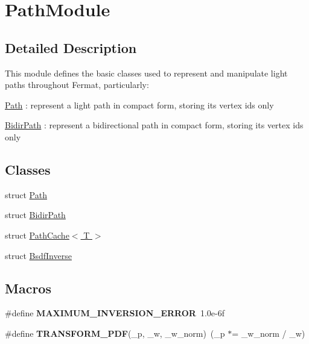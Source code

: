 \hypertarget{group___path_module}{}\section{Path\+Module}
\label{group___path_module}


\subsection{Detailed Description}
\begin{DoxyParagraph}{}
This module defines the basic classes used to represent and manipulate light paths throughout Fermat, particularly\+: 
\end{DoxyParagraph}
\begin{DoxyParagraph}{}

\begin{DoxyItemize}
\item \hyperlink{struct_path}{Path} \+: represent a light path in compact form, storing its vertex ids only
\item \hyperlink{struct_bidir_path}{Bidir\+Path} \+: represent a bidirectional path in compact form, storing its vertex ids only 
\end{DoxyItemize}
\end{DoxyParagraph}
\subsection*{Classes}
\begin{DoxyCompactItemize}
\item 
struct \hyperlink{struct_path}{Path}
\item 
struct \hyperlink{struct_bidir_path}{Bidir\+Path}
\item 
struct \hyperlink{struct_path_cache}{Path\+Cache$<$ T $>$}
\item 
struct \hyperlink{struct_bsdf_inverse}{Bsdf\+Inverse}
\end{DoxyCompactItemize}
\subsection*{Macros}
\begin{DoxyCompactItemize}
\item 
\mbox{\label{group___path_module_gaf84800d736ee11764f35286ff69fd391}} 
\#define {\bfseries M\+A\+X\+I\+M\+U\+M\+\_\+\+I\+N\+V\+E\+R\+S\+I\+O\+N\+\_\+\+E\+R\+R\+OR}~1.\+0e-\/6f
\item 
\mbox{\label{group___path_module_ga0a99a8224e6e2b94bb5c13cbeaac2edc}} 
\#define {\bfseries T\+R\+A\+N\+S\+F\+O\+R\+M\+\_\+\+P\+DF}(\+\_\+p,  \+\_\+w,  \+\_\+w\+\_\+norm)~(\+\_\+p $\ast$= \+\_\+w\+\_\+norm / \+\_\+w)
\end{DoxyCompactItemize}

